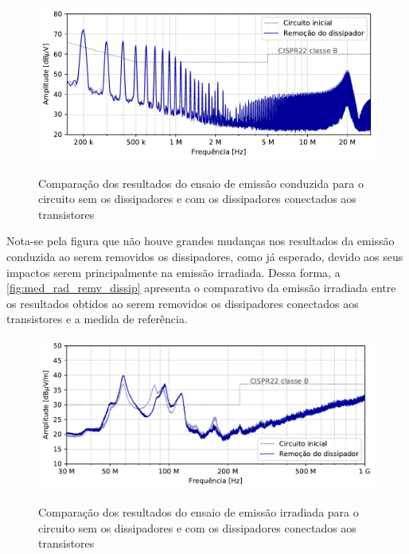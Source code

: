     \begin{figure}[H]
    	\centering
    	\caption{Comparação dos resultados do ensaio de emissão conduzida para o circuito sem os dissipadores e com os dissipadores conectados aos transistores}
    	\includegraphics[scale=.9]{pdf/cond/Remoção do dissipador.pdf}
    	\label{fig:med_cond_remv_dissip}
    \end{figure}
    
    Nota-se pela figura que não houve grandes mudanças nos resultados da emissão conduzida ao serem removidos os dissipadores, como já esperado, devido aos seus impactos serem principalmente na emissão irradiada. Dessa forma, a \autoref{fig:med_rad_remv_dissip} apresenta o comparativo da emissão irradiada entre os resultados obtidos ao serem removidos os dissipadores conectados aos transistores e a medida de referência. 
    
    \begin{figure}[H]
    	\centering
    	\caption{Comparação dos resultados do ensaio de emissão irradiada para o circuito sem os dissipadores e com os dissipadores conectados aos transistores}
    	\includegraphics[scale=.9]{pdf/rad/Remoção do dissipador.pdf}
    	\label{fig:med_rad_remv_dissip}
    \end{figure}
    
